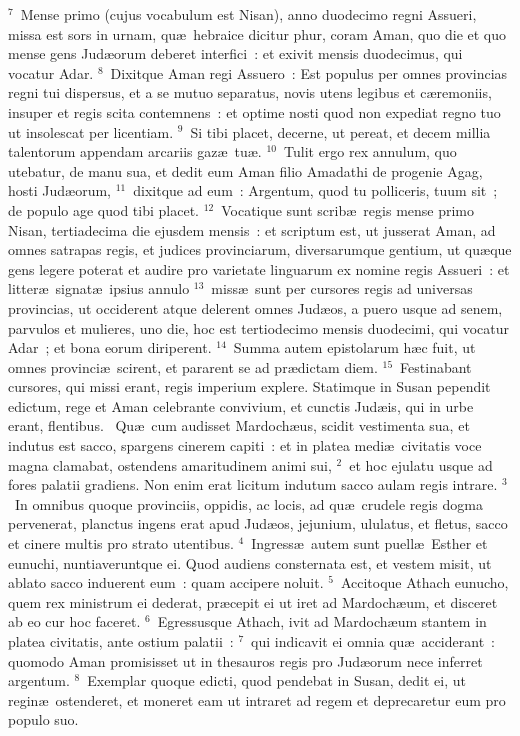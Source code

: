 ${}^{7}$~Mense primo (cujus vocabulum est Nisan), anno duodecimo regni Assueri, missa est sors in urnam, qu\ae\ hebraice dicitur phur, coram Aman, quo die et quo mense gens Jud\ae orum deberet interfici~: et exivit mensis duodecimus, qui vocatur Adar.
${}^{8}$~Dixitque Aman regi Assuero~: Est populus per omnes provincias regni tui dispersus, et a se mutuo separatus, novis utens legibus et c\ae remoniis, insuper et regis scita contemnens~: et optime nosti quod non expediat regno tuo ut insolescat per licentiam.
${}^{9}$~Si tibi placet, decerne, ut pereat, et decem millia talentorum appendam arcariis gaz\ae\ tu\ae .
${}^{10}$~Tulit ergo rex annulum, quo utebatur, de manu sua, et dedit eum Aman filio Amadathi de progenie Agag, hosti Jud\ae orum,
${}^{11}$~dixitque ad eum~: Argentum, quod tu polliceris, tuum sit~; de populo age quod tibi placet.
${}^{12}$~Vocatique sunt scrib\ae\ regis mense primo Nisan, tertiadecima die ejusdem mensis~: et scriptum est, ut jusserat Aman, ad omnes satrapas regis, et judices provinciarum, diversarumque gentium, ut qu\ae que gens legere poterat et audire pro varietate linguarum ex nomine regis Assueri~: et litter\ae\ signat\ae\ ipsius annulo
${}^{13}$~miss\ae\ sunt per cursores regis ad universas provincias, ut occiderent atque delerent omnes Jud\ae os, a puero usque ad senem, parvulos et mulieres, uno die, hoc est tertiodecimo mensis duodecimi, qui vocatur Adar~; et bona eorum diriperent.
${}^{14}$~Summa autem epistolarum h\ae c fuit, ut omnes provinci\ae\ scirent, et pararent se ad pr\ae dictam diem.
${}^{15}$~Festinabant cursores, qui missi erant, regis imperium explere. Statimque in Susan pependit edictum, rege et Aman celebrante convivium, et cunctis Jud\ae is, qui in urbe erant, flentibus.
~Qu\ae\ cum audisset Mardoch\ae us, scidit vestimenta sua, et indutus est sacco, spargens cinerem capiti~: et in platea medi\ae\ civitatis voce magna clamabat, ostendens amaritudinem animi sui,
${}^{2}$~et hoc ejulatu usque ad fores palatii gradiens. Non enim erat licitum indutum sacco aulam regis intrare.
${}^{3}$~In omnibus quoque provinciis, oppidis, ac locis, ad qu\ae\ crudele regis dogma pervenerat, planctus ingens erat apud Jud\ae os, jejunium, ululatus, et fletus, sacco et cinere multis pro strato utentibus.
${}^{4}$~Ingress\ae\ autem sunt puell\ae\ Esther et eunuchi, nuntiaveruntque ei. Quod audiens consternata est, et vestem misit, ut ablato sacco induerent eum~: quam accipere noluit.
${}^{5}$~Accitoque Athach eunucho, quem rex ministrum ei dederat, pr\ae cepit ei ut iret ad Mardoch\ae um, et disceret ab eo cur hoc faceret.
${}^{6}$~Egressusque Athach, ivit ad Mardoch\ae um stantem in platea civitatis, ante ostium palatii~:
${}^{7}$~qui indicavit ei omnia qu\ae\ acciderant~: quomodo Aman promisisset ut in thesauros regis pro Jud\ae orum nece inferret argentum.
${}^{8}$~Exemplar quoque edicti, quod pendebat in Susan, dedit ei, ut regin\ae\ ostenderet, et moneret eam ut intraret ad regem et deprecaretur eum pro populo suo.


